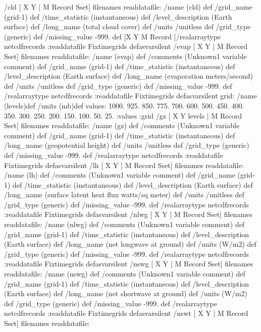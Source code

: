 \begin{ingrid}
 /cld{
[ X Y | M Record Sset] filenames readdatafile:
/name (cld) def
 /grid_name (grid-1) def
 /time_statistic (instantaneous) def
 /level_description (Earth surface) def
 /long_name (total cloud cover) def
 /units /unitless def
 /grid_type (generic) def
 /missing_value -999. def
 [X Y M Record ]/realarraytype netcdfrecords :readdatafile
Fixtimegrids
}defasvarsilent
 /evap{
[ X Y | M Record Sset] filenames readdatafile:
/name (evap) def
 /comments (Unknown1 variable comment) def
 /grid_name (grid-1) def
 /time_statistic (instantaneous) def
 /level_description (Earth surface) def
 /long_name (evaporation meters/second) def
 /units /unitless def
 /grid_type (generic) def
 /missing_value -999. def
 /realarraytype netcdfrecords :readdatafile Fixtimegrids
}defasvarsilent
grid:
/name (levels)def
/units (mb)def
values: 1000. 925. 850. 775. 700. 600. 500. 450. 400. 350. 300. 250. 200. 150. 100. 50. 25. :values
:grid
 /gz{
[ X Y levels | M Record Sset] filenames readdatafile:
/name (gz) def
 /comments (Unknown1 variable comment) def
 /grid_name (grid-1) def
 /time_statistic (instantaneous) def
 /long_name (geopotential height) def
 /units /unitless def
 /grid_type (generic) def
 /missing_value -999. def
 /realarraytype netcdfrecords :readdatafile Fixtimegrids
}defasvarsilent
 /lh{
[ X Y | M Record Sset] filenames readdatafile:
/name (lh) def
 /comments (Unknown1 variable comment) def
 /grid_name (grid-1) def
 /time_statistic (instantaneous) def
 /level_description (Earth surface) def
 /long_name (surface latent heat flux watts/sq meter) def
 /units /unitless def
 /grid_type (generic) def
 /missing_value -999. def
 /realarraytype netcdfrecords :readdatafile Fixtimegrids
}defasvarsilent
 /nlwg{
[ X Y | M Record Sset] filenames readdatafile:
/name (nlwg) def
 /comments (Unknown1 variable comment) def
 /grid_name (grid-1) def
 /time_statistic (instantaneous) def
 /level_description (Earth surface) def
 /long_name (net longwave at ground) def
 /units (W/m2) def
 /grid_type (generic) def
 /missing_value -999. def
 /realarraytype netcdfrecords :readdatafile Fixtimegrids
}defasvarsilent
 /nswg{
[ X Y | M Record Sset] filenames readdatafile:
/name (nswg) def
 /comments (Unknown1 variable comment) def
 /grid_name (grid-1) def
 /time_statistic (instantaneous) def
 /level_description (Earth surface) def
 /long_name (net shortwave at ground) def
 /units (W/m2) def
 /grid_type (generic) def
 /missing_value -999. def
 /realarraytype netcdfrecords :readdatafile Fixtimegrids
}defasvarsilent
 /nswt{
[ X Y | M Record Sset] filenames readdatafile:
}
\end{ingrid}
